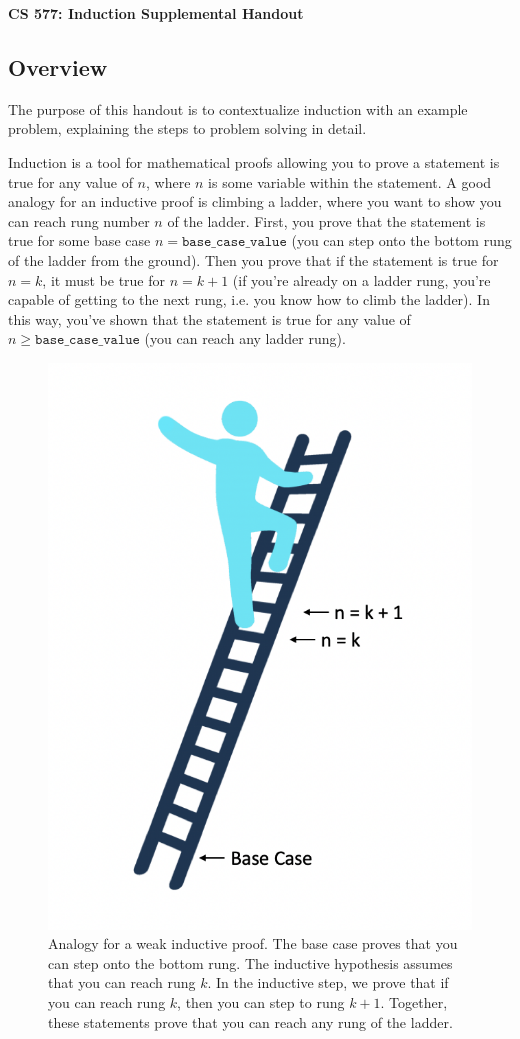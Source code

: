 \documentclass{article}
\theoremstyle{definition}
\begin{document}
\pagestyle{empty}

\title{}
\date{}

\captionsetup[figure]{labelFormat=empty}%

\Large
\begin{center}
\textbf{\newline CS 577: Induction Supplemental Handout}
\end{center}

\normalsize

\subsection*{Overview}
The purpose of this handout is to contextualize induction with an example problem, explaining the steps to problem solving in detail.

Induction is a tool for mathematical proofs allowing you to prove a statement is true for any value of $n$, where $n$ is some variable within the statement. A good analogy for an inductive proof is climbing a ladder, where you want to show you can reach rung number $n$ of the ladder. First, you prove that the statement is true for some base case $n = \texttt{base\_case\_value}$ (you can step onto the bottom rung of the ladder from the ground). Then you prove that if the statement is true for $n = k$, it must be true for $n = k+1$ (if you're already on a ladder rung, you're capable of getting to the next rung, i.e. you know how to climb the ladder). In this way, you've shown that the statement is true for any value of $n \geq \texttt{base\_case\_value}$ (you can reach any ladder rung).

\begin{figure}[h]
	\centering
    \includegraphics[width=0.5\linewidth]{ladder-induction.png}
    \captionsetup{labelformat=empty}
    \captionsetup{width=0.7\linewidth}
    \caption{Analogy for a weak inductive proof. The base case proves that you can step onto the bottom rung. The inductive hypothesis assumes that you can reach rung $k$. In  the inductive step, we prove that if you can reach rung $k$, then you can step to rung $k+1$. Together, these statements prove that you can reach any rung of the ladder.}
    \label{fig:laddder-induction}
\end{figure}
\end{document}
